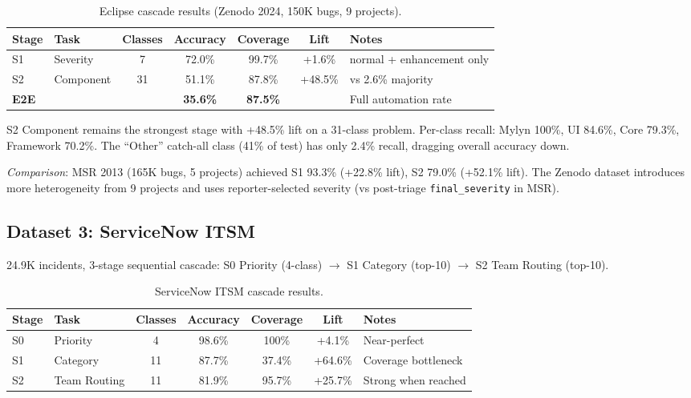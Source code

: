 \documentclass[11pt]{article}
\begin{document}
\begin{table}[h]
\centering
\caption{Eclipse cascade results (Zenodo 2024, 150K bugs, 9 projects).}
\label{tab:eclipse-cascade}
\begin{tabular}{llccccp{3cm}}
\toprule
\textbf{Stage} & \textbf{Task} & \textbf{Classes} & \textbf{Accuracy} & \textbf{Coverage} & \textbf{Lift} & \textbf{Notes} \\
\midrule
S1 & Severity & 7 & 72.0\% & 99.7\% & +1.6\% & normal + enhancement only \\
S2 & Component & 31 & 51.1\% & 87.8\% & +48.5\% & vs 2.6\% majority \\
\textbf{E2E} & & & \textbf{35.6\%} & \textbf{87.5\%} & & Full automation rate \\
\bottomrule
\end{tabular}
\end{table}

S2 Component remains the strongest stage with +48.5\% lift on a 31-class problem. Per-class recall: Mylyn 100\%, UI 84.6\%, Core 79.3\%, Framework 70.2\%. The ``Other'' catch-all class (41\% of test) has only 2.4\% recall, dragging overall accuracy down.

\emph{Comparison}: MSR 2013 (165K bugs, 5 projects) achieved S1 93.3\% (+22.8\% lift), S2 79.0\% (+52.1\% lift). The Zenodo dataset introduces more heterogeneity from 9 projects and uses reporter-selected severity (vs post-triage \texttt{final\_severity} in MSR).

\subsection{Dataset 3: ServiceNow ITSM}

24.9K incidents, 3-stage sequential cascade: S0 Priority (4-class) $\rightarrow$ S1 Category (top-10) $\rightarrow$ S2 Team Routing (top-10).

\begin{table}[h]
\centering
\caption{ServiceNow ITSM cascade results.}
\label{tab:servicenow-cascade}
\begin{tabular}{llccccp{3cm}}
\toprule
\textbf{Stage} & \textbf{Task} & \textbf{Classes} & \textbf{Accuracy} & \textbf{Coverage} & \textbf{Lift} & \textbf{Notes} \\
\midrule
S0 & Priority & 4 & 98.6\% & 100\% & +4.1\% & Near-perfect \\
S1 & Category & 11 & 87.7\% & 37.4\% & +64.6\% & Coverage bottleneck \\
S2 & Team Routing & 11 & 81.9\% & 95.7\% & +25.7\% & Strong when reached \\
\bottomrule
\end{tabular}
\end{table}
\end{document}
